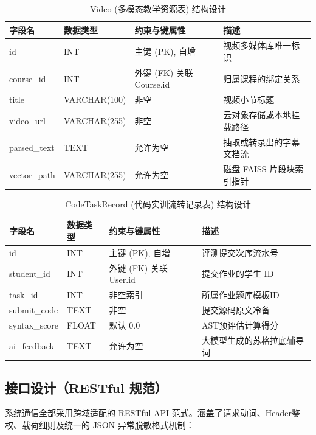 \begin{table}[htbp]
\centering
\small
\caption{Video (多模态教学资源表) 结构设计}
\label{tab:video_table}
\begin{tabular}{|p{2cm}|p{2cm}|p{4.5cm}|p{5cm}|}
\hline
\textbf{字段名} & \textbf{数据类型} & \textbf{约束与键属性} & \textbf{描述} \\ \hline
id & INT & 主键 (PK), 自增 & 视频多媒体库唯一标识 \\ \hline
course\_id & INT & 外键 (FK) 关联 Course.id& 归属课程的绑定关系 \\ \hline
title & VARCHAR(100) & 非空 & 视频小节标题 \\ \hline
video\_url & VARCHAR(255)& 非空 & 云对象存储或本地挂载路径 \\ \hline
parsed\_text & TEXT & 允许为空 & 抽取或转录出的字幕文档流 \\ \hline
vector\_path & VARCHAR(255)& 允许为空 & 磁盘 FAISS 片段块索引指针 \\ \hline
\end{tabular}
\end{table}

\begin{table}[htbp]
\centering
\small
\caption{CodeTaskRecord (代码实训流转记录表) 结构设计}
\label{tab:code_record_table}
\begin{tabular}{|p{2cm}|p{2cm}|p{4.5cm}|p{5cm}|}
\hline
\textbf{字段名} & \textbf{数据类型} & \textbf{约束与键属性} & \textbf{描述} \\ \hline
id & INT & 主键 (PK), 自增 & 评测提交次序流水号 \\ \hline
student\_id & INT & 外键 (FK) 关联 User.id & 提交作业的学生 ID \\ \hline
task\_id & INT & 非空索引 & 所属作业题库模板ID \\ \hline
submit\_code & TEXT & 非空 & 提交源码原文冷备 \\ \hline
syntax\_score& FLOAT & 默认 0.0 & AST预评估计算得分 \\ \hline
ai\_feedback & TEXT & 允许为空 & 大模型生成的苏格拉底辅导词 \\ \hline
\end{tabular}
\end{table}

\subsection{接口设计（RESTful 规范）}

系统通信全部采用跨域适配的 RESTful API 范式。涵盖了请求动词、Header鉴权、载荷细则及统一的 JSON 异常脱敏格式机制：

